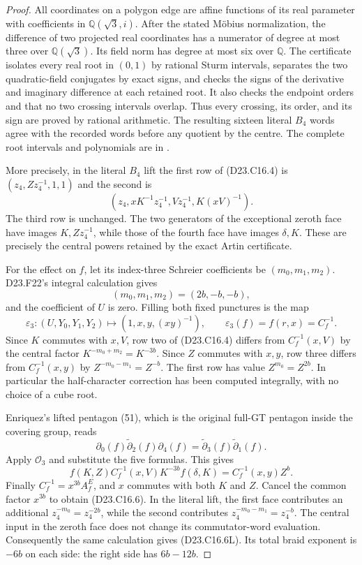 \begin{proof}
All coordinates on a polygon edge are affine functions of its
real parameter with coefficients in $\mathbb Q(\sqrt3,i)$.
After the stated M\"obius normalization, the difference of two
projected real coordinates has a numerator of degree at most
three over $\mathbb Q(\sqrt3)$. Its field norm has degree at
most six over $\mathbb Q$. The certificate isolates every real
root in $(0,1)$ by rational Sturm intervals, separates the two
quadratic-field conjugates by exact signs, and checks the signs
of the derivative and imaginary difference at each retained
root. It also checks the endpoint orders and that no two
crossing intervals overlap. Thus every crossing, its order,
and its sign are proved by rational arithmetic. The resulting
sixteen literal $B_4$ words agree with the recorded words before
any quotient by the centre. The complete root intervals and
polynomials are in .

More precisely, in the literal $B_4$ lift the first row of
(D23.C16.4) is $(z_4,Zz_4^{-1},1,1)$ and the second is
\[
       (z_4,xK^{-1}z_4^{-1},Vz_4^{-1},K(xV)^{-1}).
\]
The third row is unchanged. The two generators of the exceptional
zeroth face have images $K,Zz_4^{-1}$, while those of the fourth
face have images $\delta,K$. These are precisely the central
powers retained by the exact Artin certificate.

For the effect on $f$, let its index-three Schreier coefficients
be $(m_0,m_1,m_2)$. D23.F22's integral calculation gives
\[
                    (m_0,m_1,m_2)=(2b,-b,-b),
\]
and the coefficient of $U$ is zero. Filling both fixed punctures
is the map
\[
 \varepsilon_3:(U,Y_0,Y_1,Y_2)\longmapsto
                (1,x,y,(xy)^{-1}),\qquad
 \varepsilon_3(f)=f(r,x)=C_f^{-1}.
\]
Since $K$ commutes with $x,V$, row two of (D23.C16.4) differs
from $C_f^{-1}(x,V)$ by the central factor
$K^{-m_0+m_2}=K^{-3b}$. Since $Z$ commutes with $x,y$,
row three differs from $C_f^{-1}(x,y)$ by
$Z^{-m_0-m_1}=Z^{-b}$. The first row has value $Z^{m_0}=Z^{2b}$.
In particular the half-character correction has been computed
integrally, with no choice of a cube root.

Enriquez's lifted pentagon (51), which is the original full-GT
pentagon inside the covering group, reads
\[
 \partial_0(f)\widetilde\partial_2(f)\partial_4(f)
             =\widetilde\partial_3(f)\widetilde\partial_1(f).
\]
Apply $\mathcal O_3$ and substitute the five formulas. This gives
\[
 f(K,Z)C_f^{-1}(x,V)K^{-3b}f(\delta,K)
                         =C_f^{-1}(x,y)Z^b.
\]
Finally $C_f^{-1}=x^{3b}A^E_f$, and $x$ commutes with both $K$
and $Z$. Cancel the common factor $x^{3b}$ to obtain
(D23.C16.6).
In the literal lift, the first face contributes an additional
$z_4^{-m_0}=z_4^{-2b}$, while the second contributes
$z_4^{-m_0-m_1}=z_4^{-b}$. The central input in the zeroth face
does not change its commutator-word evaluation. Consequently
the same calculation gives (D23.C16.6L). Its total braid exponent
is $-6b$ on each side: the right side has $6b-12b$.
\end{proof}

